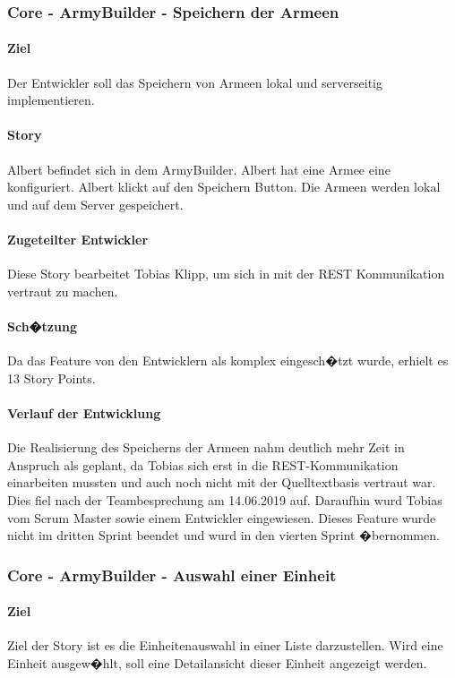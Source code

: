 \documentclass[12pt, titlepage]{scrartcl}
\begin{document}
		\subsubsection{Core - ArmyBuilder - Speichern der Armeen}
		\paragraph{Ziel} Der Entwickler soll das Speichern von Armeen lokal und serverseitig implementieren.
		\paragraph{Story} Albert befindet sich in dem ArmyBuilder. Albert hat eine Armee eine konfiguriert. Albert klickt auf den Speichern Button. Die Armeen werden lokal und auf dem Server gespeichert.
		\paragraph{Zugeteilter Entwickler} Diese Story bearbeitet Tobias Klipp, um sich in mit der REST Kommunikation vertraut zu machen.
		\paragraph{Sch�tzung}
		Da das Feature von den Entwicklern als komplex eingesch�tzt wurde, erhielt es 13 Story Points.
		\paragraph{Verlauf der Entwicklung} Die Realisierung des Speicherns der Armeen nahm deutlich mehr Zeit in Anspruch als geplant, da Tobias sich erst in die REST-Kommunikation einarbeiten mussten und auch noch nicht mit der Quelltextbasis vertraut war. Dies fiel nach der Teambesprechung am 14.06.2019 auf. Daraufhin wurd Tobias vom Scrum Master sowie einem Entwickler eingewiesen. Dieses Feature wurde nicht im dritten Sprint beendet und wurd in den vierten Sprint �bernommen.
		
		\subsubsection{Core - ArmyBuilder - Auswahl einer Einheit}
		\paragraph{Ziel} Ziel der Story ist es die Einheitenauswahl in einer Liste darzustellen. Wird eine Einheit ausgew�hlt, soll eine Detailansicht dieser Einheit angezeigt werden.
\end{document}
